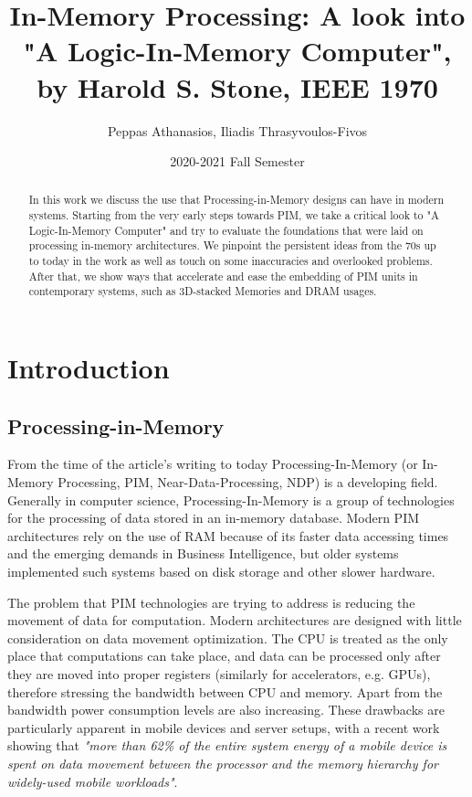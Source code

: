 \documentclass[12pt,twocolumn]{IEEEtran}
\title{In-Memory Processing: A look into "A Logic-In-Memory Computer", by Harold S. Stone, IEEE 1970}
\date{2020-2021 Fall Semester}
\author{Peppas Athanasios, Iliadis Thrasyvoulos-Fivos}
\begin{document}
  \maketitle

\begin{abstract}
In this work we discuss the use that Processing-in-Memory designs can have in modern systems. Starting from the very early steps towards PIM, we take a critical look to "A Logic-In-Memory Computer" and try to evaluate the foundations that were laid on processing in-memory architectures. We pinpoint the persistent ideas from the 70s up to today in the work as well as touch on some inaccuracies and overlooked problems. After that, we show ways that accelerate and ease the embedding of PIM units in contemporary systems, such as 3D-stacked Memories and DRAM usages.
\end{abstract}

\section{Introduction}
\subsection{Processing-in-Memory}
From the time of the article's writing to today Processing-In-Memory (or In-Memory Processing, PIM, Near-Data-Processing, NDP)  is a developing field. Generally in computer science, Processing-In-Memory is a group of technologies for the processing of data stored in an in-memory database. Modern PIM architectures rely on the use of RAM because of its faster data accessing times and the emerging demands in Business Intelligence, but older systems implemented such systems based on disk storage and other slower hardware. 

The problem that PIM technologies are trying to address is reducing the movement of data for computation. Modern architectures are designed with little consideration on data movement optimization. The CPU is treated as the only place that computations can take place, and data can be processed only after they are moved into proper registers (similarly for accelerators, e.g. GPUs), therefore stressing the bandwidth between CPU and memory. Apart from the bandwidth power consumption levels are also increasing. These drawbacks are particularly apparent in mobile devices and server setups, with a recent work showing that \textit{"more than 62\% of the entire
system energy of a mobile device is spent on data movement between the processor and the memory hierarchy for widely-used mobile workloads"}\cite{ARTICLE:1, PAPER:1}.
\end{document}
